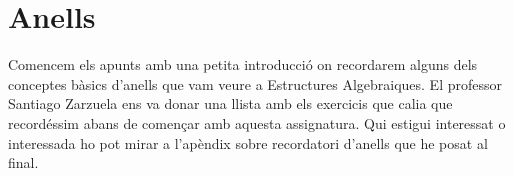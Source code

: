 \documentclass[../../main.tex]{subfiles}
\begin{document}
\chapter{Anells}


Comencem els apunts amb una petita introducció on recordarem alguns dels conceptes bàsics d'anells que vam veure a Estructures Algebraiques. El professor Santiago Zarzuela ens va donar una llista amb els exercicis que calia que recordéssim abans de començar amb aquesta assignatura. Qui estigui interessat o interessada ho pot mirar a l'apèndix sobre recordatori d'anells que he posat al final.





\end{document}
